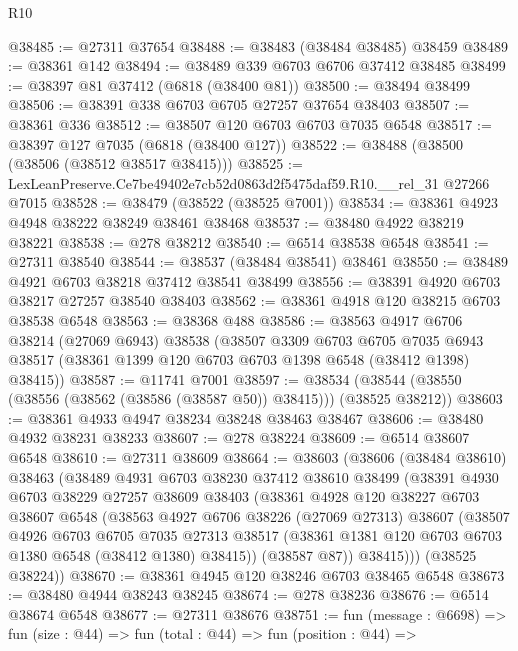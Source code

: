 \begin{lexlean}{R10}
\begin{coremodule}
@38485 := @27311 @37654
@38488 := @38483 (@38484 @38485) @38459
@38489 := @38361 @142
@38494 := @38489 @339 @6703 @6706 @37412 @38485
@38499 := @38397 @81 @37412 (@6818 (@38400 @81))
@38500 := @38494 @38499
@38506 := @38391 @338 @6703 @6705 @27257 @37654 @38403
@38507 := @38361 @336
@38512 := @38507 @120 @6703 @6703 @7035 @6548
@38517 := @38397 @127 @7035 (@6818 (@38400 @127))
@38522 := @38488 (@38500 (@38506 (@38512 @38517 @38415)))
@38525 := LexLeanPreserve.Ce7be49402e7cb52d0863d2f5475daf59.R10.__rel_31 @27266 @7015
@38528 := @38479 (@38522 (@38525 @7001))
@38534 := @38361 @4923 @4948 @38222 @38249 @38461 @38468
@38537 := @38480 @4922 @38219 @38221
@38538 := @278 @38212
@38540 := @6514 @38538 @6548
@38541 := @27311 @38540
@38544 := @38537 (@38484 @38541) @38461
@38550 := @38489 @4921 @6703 @38218 @37412 @38541 @38499
@38556 := @38391 @4920 @6703 @38217 @27257 @38540 @38403
@38562 := @38361 @4918 @120 @38215 @6703 @38538 @6548
@38563 := @38368 @488
@38586 := @38563
    @4917
    @6706
    @38214
    (@27069 @6943)
    @38538
    (@38507
      @3309
      @6703
      @6705
      @7035
      @6943
      @38517
      (@38361 @1399 @120 @6703 @6703 @1398 @6548 (@38412 @1398) @38415))
@38587 := @11741 @7001
@38597 := @38534 (@38544 (@38550 (@38556 (@38562 (@38586 (@38587 @50)) @38415))) (@38525 @38212))
@38603 := @38361 @4933 @4947 @38234 @38248 @38463 @38467
@38606 := @38480 @4932 @38231 @38233
@38607 := @278 @38224
@38609 := @6514 @38607 @6548
@38610 := @27311 @38609
@38664 := @38603
    (@38606
      (@38484 @38610)
      @38463
      (@38489
        @4931
        @6703
        @38230
        @37412
        @38610
        @38499
        (@38391
          @4930
          @6703
          @38229
          @27257
          @38609
          @38403
          (@38361
            @4928
            @120
            @38227
            @6703
            @38607
            @6548
            (@38563
              @4927
              @6706
              @38226
              (@27069 @27313)
              @38607
              (@38507
                @4926
                @6703
                @6705
                @7035
                @27313
                @38517
                (@38361 @1381 @120 @6703 @6703 @1380 @6548 (@38412 @1380) @38415))
              (@38587 @87))
            @38415)))
      (@38525 @38224))
@38670 := @38361 @4945 @120 @38246 @6703 @38465 @6548
@38673 := @38480 @4944 @38243 @38245
@38674 := @278 @38236
@38676 := @6514 @38674 @6548
@38677 := @27311 @38676
@38751 := fun (message : @6698) =>
  fun (size : @44) =>
  fun (total : @44) =>
  fun (position : @44) =>

\end{coremodule}
\end{lexlean}
